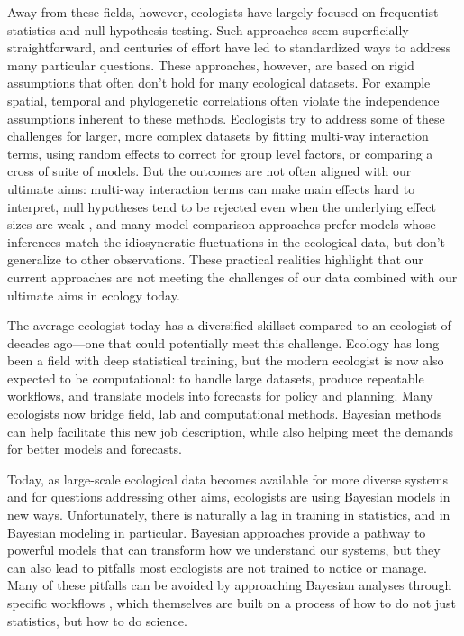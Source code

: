 Away from these fields, however, ecologists have largely focused on frequentist statistics and null hypothesis testing. Such approaches seem superficially straightforward, and centuries of effort have led to standardized ways to address many particular questions. These approaches, however, are based on rigid assumptions that often don't hold for many ecological datasets.  For example spatial, temporal and phylogenetic correlations often violate the independence assumptions inherent to these methods. %
Ecologists try to address some of these challenges for larger, more complex datasets by fitting multi-way interaction terms, using random effects to correct for group level factors, or comparing a cross of suite of models. But the outcomes are not often aligned with our ultimate aims:  multi-way interaction terms can make main effects hard to interpret, null hypotheses tend to be rejected even when the underlying effect sizes are weak \citep{gelmanhill,muff2022rewriting}, and many model comparison approaches prefer models whose inferences match the idiosyncratic fluctuations in the ecological data, but don’t generalize to other observations. These practical realities highlight that our current approaches are not meeting the challenges of our data combined with our ultimate aims in ecology today.



The average ecologist today has a diversified skillset compared to an ecologist of decades ago---one that could potentially meet this challenge. Ecology has long been a field with deep statistical training, but the modern ecologist is now also expected to be computational: to handle large datasets, produce repeatable workflows, and translate models into forecasts for policy and planning. Many ecologists now bridge field, lab and computational methods. Bayesian methods can help facilitate this new job description, while also helping meet the demands for better models and forecasts. %

Today, as large-scale ecological data becomes available for more diverse systems and for questions addressing other aims, ecologists are using Bayesian models in new ways. Unfortunately, there is naturally a lag in training in statistics, and in Bayesian modeling in particular. Bayesian approaches provide a pathway to powerful models that can transform how we understand our systems, but they can also lead to pitfalls most ecologists are not trained to notice or manage. Many of these pitfalls can be avoided by approaching Bayesian analyses through specific workflows \citep{betanworkflow,vandeschoot2021}, which themselves are built on a process of how to do not just statistics, but how to do science. %

